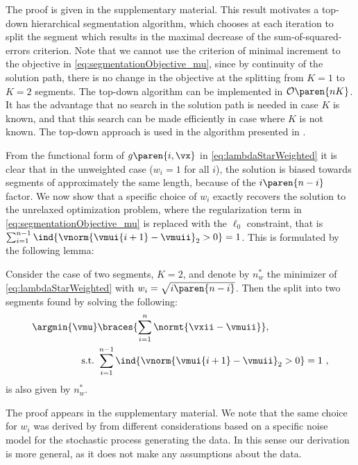The proof is given in %
the supplementary material.
This result motivates a top-down hierarchical segmentation algorithm, which chooses at each iteration to split the segment
which results in the maximal decrease of the sum-of-squared-errors criterion. Note that we
cannot use the criterion of minimal increment to the objective in \eqref{eq:segmentationObjective_mu}, since by continuity of
the solution path, there is no change in the objective at the splitting from $K=1$ to $K=2$ segments. The top-down algorithm can be implemented in $\mathcal{O}\paren{nK}$.
It has the advantage that no search in the solution path is needed in case $K$ is known, and
that this search can be made efficiently in case where $K$ is not known. The top-down approach is used in the algorithm presented in .

From the functional form of $g\paren{i,\vx}$ in \eqref{eq:lambdaStarWeighted} it is clear that in the unweighted case ($w_i=1$ for all $i$), the solution is biased towards segments of approximately the same length, because of the $i\paren{n-i}$ factor.
We now show that a specific choice of $w_i$ exactly recovers the solution to the unrelaxed optimization problem, where the regularization term in \eqref{eq:segmentationObjective_mu} is replaced with the $\ell_0$ constraint, that is $\sum_{i=1}^{n-1}\ind{\vnorm{\vmui{i+1}-\vmuii}_2>0}=1$. This is formulated by the following lemma:
\begin{lemma}\label{lem:weighted_solution_l0_l1}
    Consider the case of two segments, $K=2$, and denote by $n_w^*$ the minimizer of \eqref{eq:lambdaStarWeighted} with $w_i=\sqrt{i\paren{n-i}}$. Then the split into two segments found by solving the following: %
    \begin{align}\label{eq:segmentationObjective_unrelaxed_K=2}
        \argmin{\vmu}&\braces{\sum_{i=1}^n\normt{\vxii-\vmuii}},\\
        \mathrm{s.t.}\ &\sum_{i=1}^{n-1}\ind{\vnorm{\vmui{i+1}-\vmuii}_2>0}=1~,\nonumber
    \end{align}
    is also given by $n_w^*$.
\end{lemma}
The proof appears in %
the supplementary material.
We note that the same choice for $w_i$ was derived by \cite{bleakley2011group} from different considerations based on a specific noise model for the stochastic process generating the data. In this sense our derivation is more general, as it does not make any assumptions about the data.


